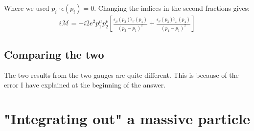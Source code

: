 \documentclass{article}
\begin{document}
Where we used $p_i\cdot\epsilon(p_i) = 0$. Changing the indices in the second fractions gives:
\begin{equation}
\begin{gathered}
    i\mathcal{M} = 
    -i2e^2p_1^\mu p_2^\nu\left[
        \frac{\epsilon_\mu(p_3)\tilde{\epsilon}_\nu(p_4)}{(p_3 - p_1)^2} +
        \frac{\epsilon_\nu(p_3)\tilde{\epsilon}_\mu(p_4)}{(p_4 - p_1)^2}
    \right]
\end{gathered}
\end{equation}
\subsection{Comparing the two}
The two results from the two gauges are quite different. This is because of the error I have explained at the beginning of the answer. 
\newpage
\section{"Integrating out" a massive particle}
\end{document}
